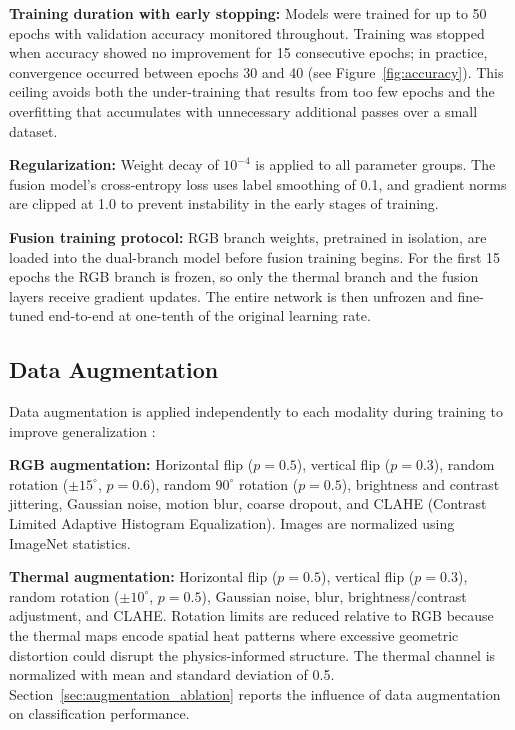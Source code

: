 \documentclass[utf8]{FrontiersinHarvard} %
\begin{document}
\textbf{Training duration with early stopping:} Models were trained for up to 50 epochs with validation accuracy monitored throughout. Training was stopped when accuracy showed no improvement for 15 consecutive epochs; in practice, convergence occurred between epochs 30 and 40 (see Figure~\ref{fig:accuracy}). This ceiling avoids both the under-training that results from too few epochs and the overfitting that accumulates with unnecessary additional passes over a small dataset.

\textbf{Regularization:} Weight decay of $10^{-4}$ is applied to all parameter groups. The fusion model's cross-entropy loss uses label smoothing of 0.1, and gradient norms are clipped at 1.0 to prevent instability in the early stages of training.

\textbf{Fusion training protocol:} RGB branch weights, pretrained in isolation, are loaded into the dual-branch model before fusion training begins. For the first 15 epochs the RGB branch is frozen, so only the thermal branch and the fusion layers receive gradient updates. The entire network is then unfrozen and fine-tuned end-to-end at one-tenth of the original learning rate.

\subsection{Data Augmentation}
Data augmentation is applied independently to each modality during training to improve generalization \cite{shorten2019}:

\textbf{RGB augmentation:} Horizontal flip ($p{=}0.5$), vertical flip ($p{=}0.3$), random rotation ($\pm 15^{\circ}$, $p{=}0.6$), random $90^{\circ}$ rotation ($p{=}0.5$), brightness and contrast jittering, Gaussian noise, motion blur, coarse dropout, and CLAHE (Contrast Limited Adaptive Histogram Equalization). Images are normalized using ImageNet statistics.

\textbf{Thermal augmentation:} Horizontal flip ($p{=}0.5$), vertical flip ($p{=}0.3$), random rotation ($\pm 10^{\circ}$, $p{=}0.5$), Gaussian noise, blur, brightness/contrast adjustment, and CLAHE. Rotation limits are reduced relative to RGB because the thermal maps encode spatial heat patterns where excessive geometric distortion could disrupt the physics-informed structure. The thermal channel is normalized with mean and standard deviation of 0.5. Section~\ref{sec:augmentation_ablation} reports the influence of data augmentation on classification performance.
\end{document}
